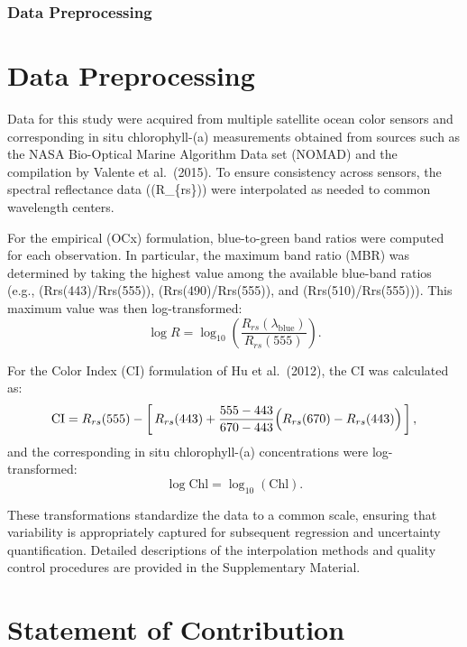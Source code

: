 \documentclass[
]{agujournal2019}
\begin{document}
\subsubsection{Data Preprocessing}\label{data-preprocessing}

\subsubsection{}\label{section}

\section{Data Preprocessing}

Data for this study were acquired from multiple satellite ocean color
sensors and corresponding in situ chlorophyll-(a) measurements obtained
from sources such as the NASA Bio-Optical Marine Algorithm Data set
(NOMAD) and the compilation by Valente et al.~(2015). To ensure
consistency across sensors, the spectral reflectance data ((R\_\{rs\}))
were interpolated as needed to common wavelength centers.

For the empirical (OCx) formulation, blue-to-green band ratios were
computed for each observation. In particular, the maximum band ratio
(MBR) was determined by taking the highest value among the available
blue-band ratios (e.g., (Rrs(443)/Rrs(555)), (Rrs(490)/Rrs(555)), and
(Rrs(510)/Rrs(555))). This maximum value was then log-transformed: \[
\log R = \log_{10}\left(\frac{R_{rs}(\lambda_{\text{blue}})}{R_{rs}(555)}\right).
\]

For the Color Index (CI) formulation of Hu et al.~(2012), the CI was
calculated as: \[
\text{CI} = R_{rs}(555) - \left[\,R_{rs}(443) + \frac{555-443}{670-443}\Bigl(R_{rs}(670) - R_{rs}(443)\Bigr)\,\right],
\] and the corresponding in situ chlorophyll-(a) concentrations were
log-transformed: \[
\log \text{Chl} = \log_{10}(\text{Chl}).
\]

These transformations standardize the data to a common scale, ensuring
that variability is appropriately captured for subsequent regression and
uncertainty quantification. Detailed descriptions of the interpolation
methods and quality control procedures are provided in the Supplementary
Material.

\section{Statement of Contribution}\label{statement-of-contribution}
\end{document}
